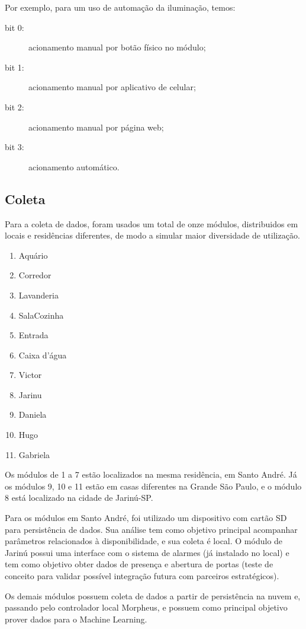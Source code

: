 Por exemplo, para um uso de automação da iluminação, temos:

\begin{description}
	\item [bit 0:] acionamento manual por botão físico no módulo;
	\item [bit 1:] acionamento manual por aplicativo de celular;
	\item [bit 2:] acionamento manual por página web;
	\item [bit 3:] acionamento automático.
\end{description}

\subsection{Coleta}

Para a coleta de dados, foram usados um total de onze módulos, distribuidos em locais e residências diferentes, de modo a simular maior diversidade de utilização.

\begin{enumerate}
	\item Aquário
	\item Corredor
	\item Lavanderia
	\item Sala\textslash{}Cozinha
	\item Entrada
	\item Caixa d’água
	\item Victor
	\item Jarinu
	\item Daniela
	\item Hugo
	\item Gabriela
\end{enumerate}

Os módulos de 1 a 7 estão localizados na mesma residência, em Santo André. Já os módulos 9, 10 e 11 estão em casas diferentes na Grande São Paulo, e o módulo 8 está localizado na cidade de Jarinú-SP.

Para os módulos em Santo André, foi utilizado um dispositivo com cartão SD para persistência de dados. Sua análise tem como objetivo principal acompanhar parâmetros relacionados à disponibilidade, e sua coleta é local. O módulo de Jarinú possui uma interface com o sistema de alarmes (já instalado no local) e tem como objetivo obter dados de presença e abertura de portas (teste de conceito para validar possível integração futura com parceiros estratégicos).

Os demais módulos possuem coleta de dados a partir de persistência na nuvem e, passando pelo controlador local Morpheus, e possuem como principal objetivo prover dados para o Machine Learning.


